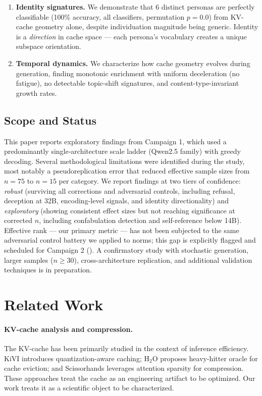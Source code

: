 \documentclass[11pt,a4paper]{article}
\begin{document}
\begin{enumerate}[leftmargin=*]
    \item \textbf{Identity signatures.} We demonstrate that 6 distinct personas are perfectly classifiable (100\% accuracy, all classifiers, permutation $p = 0.0$) from KV-cache geometry alone, despite individuation magnitude being generic. Identity is a \emph{direction} in cache space --- each persona's vocabulary creates a unique subspace orientation.

    \item \textbf{Temporal dynamics.} We characterize how cache geometry evolves during generation, finding monotonic enrichment with uniform deceleration (no fatigue), no detectable topic-shift signatures, and content-type-invariant growth rates.
\end{enumerate}

\subsection{Scope and Status}

This paper reports exploratory findings from Campaign 1, which used a predominantly single-architecture scale ladder (Qwen2.5 family) with greedy decoding. Several methodological limitations were identified during the study, most notably a pseudoreplication error that reduced effective sample sizes from $n = 75$ to $n = 15$ per category. We report findings at two tiers of confidence: \emph{robust} (surviving all corrections and adversarial controls, including refusal, deception at 32B, encoding-level signals, and identity directionality) and \emph{exploratory} (showing consistent effect sizes but not reaching significance at corrected $n$, including confabulation detection and self-reference below 14B). Effective rank --- our primary metric --- has not been subjected to the same adversarial control battery we applied to norms; this gap is explicitly flagged and scheduled for Campaign 2 (). A confirmatory study with stochastic generation, larger samples ($n \geq 30$), cross-architecture replication, and additional validation techniques is in preparation.

\section{Related Work}
\label{sec:related}

\paragraph{KV-cache analysis and compression.}
The KV-cache has been primarily studied in the context of inference efficiency. KiVI \citep{liu2024kivi} introduces quantization-aware caching; H$_2$O \citep{zhang2024h2o} proposes heavy-hitter oracle for cache eviction; and Scissorhands \citep{liu2023scissorhands} leverages attention sparsity for compression. These approaches treat the cache as an engineering artifact to be optimized. Our work treats it as a scientific object to be characterized.
\end{document}
